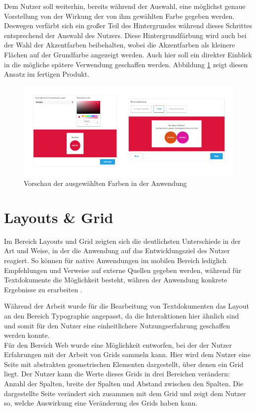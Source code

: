 Dem Nutzer soll weiterhin, bereits während der Auswahl, eine möglichst genaue Vorstellung von der Wirkung der von ihm gewählten Farbe gegeben werden. Deswegen verfärbt sich ein großer Teil des Hintergrundes während dieses Schrittes entsprechend der Auswahl des Nutzers. Diese Hintergrundfärbung wird auch bei der Wahl der Akzentfarben beibehalten, wobei die Akzentfarben als kleinere Flächen auf der Grundfarbe angezeigt werden. Auch hier soll ein direkter Einblick in die mögliche spätere Verwendung geschaffen werden. Abbildung \ref{fig:colors_bg} zeigt diesen Ansatz im fertigen Produkt.

\begin{figure}[h]
    \centering
    \includegraphics[width=1\textwidth]{images/colors_background.png}
    \caption{Vorschau der ausgewählten Farben in der Anwendung}
    \label{fig:colors_bg}
\end{figure}

\section{Layouts \& Grid}

Im Bereich Layouts und Grid zeigten sich die deutlichsten Unterschiede in der Art und Weise, in der die Anwendung auf das Entwicklungsziel des Nutzer reagiert.
So können für native Anwendungen im mobilen Bereich lediglich Empfehlungen und Verweise auf externe Quellen gegeben werden, während für Textdokumente die Möglichkeit besteht, währen der Anwendung konkrete Ergebnisse zu erarbeiten \cite{PoplawskiPP}.

Während der Arbeit wurde für die Bearbeitung von Textdokumenten das Layout an den Bereich Typographie angepasst, da die Interaktionen hier ähnlich sind und somit für den Nutzer eine einheitlichere Nutzungserfahrung geschaffen werden konnte.\\
Für den Bereich Web wurde eine Möglichkeit entworfen, bei der der Nutzer Erfahrungen mit der Arbeit von Grids sammeln kann. Hier wird dem Nutzer eine Seite mit abstrakten geometrischen Elementen dargestellt, über denen ein Grid liegt. Der Nutzer kann die Werte dieses Grids in drei Bereichen verändern: Anzahl der Spalten, breite der Spalten und Abstand zwischen den Spalten. Die dargestellte Seite verändert sich zusammen mit dem Grid und zeigt dem Nutzer so, welche Auswirkung eine Veränderung des Grids haben kann.

